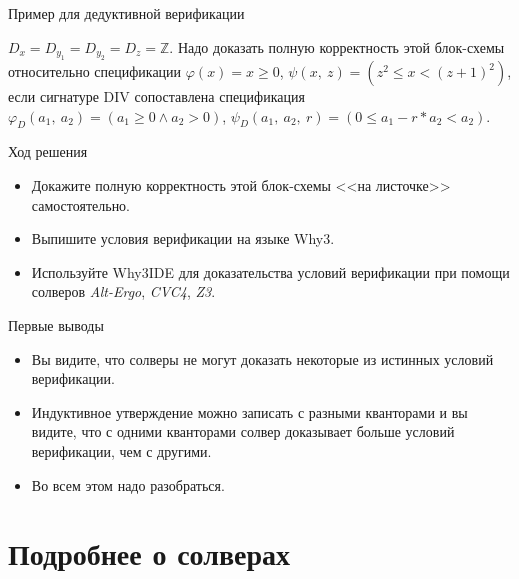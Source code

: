 \documentclass[hyperref={unicode=true}]{beamer}
\begin{document}
\begin{frame}[fragile]{Пример для дедуктивной верификации}
\begin{multicols}{2}
	\normalsize

    $D_{x} = D_{y_1} = D_{y_2} = D_{z} = \mathbb{Z}$.
    Надо доказать полную корректность этой блок-схемы
    относительно спецификации $\varphi(x) = x \geq 0$,
    $\psi(x,~z) = (z^2 \leq x < (z + 1)^2)$, если
    сигнатуре DIV сопоставлена спецификация
    $\varphi_D(a_1,~a_2) = (a_1 \geq 0 \land a_2 > 0)$,
    $\psi_D(a_1,~a_2,~r) = (0 \leq a_1 - r * a_2 < a_2)$.
    \end{multicols}
	\end{frame}

    \begin{frame}{Ход решения}
    \begin{itemize}
    \item
    Докажите полную корректность этой блок-схемы
    <<на листочке>> самостоятельно.
    \item
    Выпишите условия верификации на языке Why3.
    \item
    Используйте Why3IDE для доказательства условий
    верификации при помощи солверов \textsl{Alt-Ergo},
    \textsl{CVC4}, \textsl{Z3}.
    \end{itemize}
    \end{frame}

    \begin{frame}{Первые выводы}
    \begin{itemize}
    \item
    Вы видите, что солверы не могут доказать некоторые
    из истинных условий верификации.
    \item
    Индуктивное утверждение можно записать с разными
    кванторами и вы видите, что с одними кванторами солвер
    доказывает больше условий верификации, чем с другими.
    \item
    Во всем этом надо разобраться.
    \end{itemize}
    \end{frame}

    \section{Подробнее о солверах}
\end{document}
